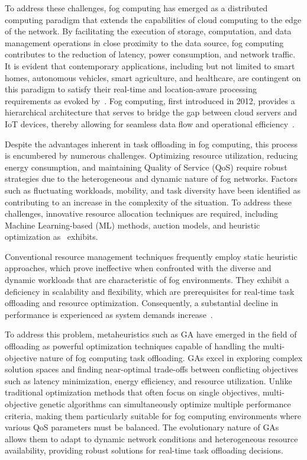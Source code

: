 \documentclass[preprint,3p,authoryear]{elsarticle}
\begin{document}
To address these challenges, fog computing has emerged as a distributed computing paradigm that extends the capabilities of cloud computing to the edge of the network. By facilitating the execution of storage, computation, and data management operations in close proximity to the data source, fog computing contributes to the reduction of latency, power consumption, and network traffic. It is evident that contemporary applications, including but not limited to smart homes, autonomous vehicles, smart agriculture, and healthcare, are contingent on this paradigm to satisfy their real-time and location-aware processing requirements as evoked by~\cite{das_review_2023}. Fog computing, first introduced in 2012, provides a hierarchical architecture that serves to bridge the gap between cloud servers and IoT devices, thereby allowing for seamless data flow and operational efficiency~\citep{fahimullah_review_2022}.

Despite the advantages inherent in task offloading in fog computing, this process is encumbered by numerous challenges. Optimizing resource utilization, reducing energy consumption, and maintaining Quality of Service (QoS) require robust strategies due to the heterogeneous and dynamic nature of fog networks. Factors such as fluctuating workloads, mobility, and task diversity have been identified as contributing to an increase in the complexity of the situation. To address these challenges, innovative resource allocation techniques are required, including Machine Learning-based (ML) methods, auction models, and heuristic optimization as~\cite{fahimullah_review_2022} exhibits.

Conventional resource management techniques frequently employ static heuristic approaches, which prove ineffective when confronted with the diverse and dynamic workloads that are characteristic of fog environments. They exhibit a deficiency in scalability and flexibility, which are prerequisites for real-time task offloading and resource optimization. Consequently, a substantial decline in performance is experienced as system demands increase~\citep{iftikhar_ai-based_2023}.

To address this problem, metaheuristics such as GA have emerged in the field of offloading as powerful optimization techniques capable of handling the multi-objective nature of fog computing task offloading. GAs excel in exploring complex solution spaces and finding near-optimal trade-offs between conflicting objectives such as latency minimization, energy efficiency, and resource utilization. Unlike traditional optimization methods that often focus on single objectives, multi-objective genetic algorithms can simultaneously optimize multiple performance criteria, making them particularly suitable for fog computing environments where various QoS parameters must be balanced. The evolutionary nature of GAs allows them to adapt to dynamic network conditions and heterogeneous resource availability, providing robust solutions for real-time task offloading decisions.
\end{document}
